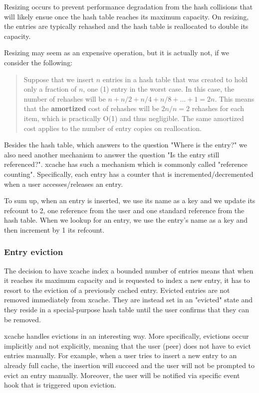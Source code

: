 Resizing occurs to prevent performance degradation from the hash collisions 
that will likely ensue once the hash table reaches its maximum capacity. On 
resizing, the entries are typically rehashed and the hash table is reallocated 
to double its capacity.

Resizing may seem as an expensive operation, but it is actually not, if we 
consider the following:
\begin{quotation}
\cite{hash-resize}Suppose that we insert \(n\) entries in a hash table that was 
created to hold only a fraction of \(n\), one (1) entry in the worst case. In 
this case, the number of rehashes will be \(n + n/2 + n/4 + n/8 + ... + 1 = 
	2n\).  This means that the \textbf{amortized} cost of rehashes will be 
\(2n/n = 2\) rehashes for each item, which is practically O(1) and thus 
negligible.  The same amortized cost applies to the number of entry copies on 
reallocation.
\end{quotation}

Besides the hash table, which answers to the question "Where is the entry?" we 
also need another mechanism to answer the question "Is the entry still 
referenced?". xcache has such a mechanism which is commonly called "reference 
counting". Specifically, each entry has a counter that is 
incremented/decremented when a user accesses/releases an entry.

To sum up, when an entry is inserted, we use its name as a key and we update 
its refcount to 2, one reference from the user and one standard reference from 
the hash table. When we lookup for an entry, we use the entry's name as a key 
and then increment by 1 its refcount. 

\subsubsection{Entry eviction}\label{sec:xcache-eviction-design}

The decision to have xcache index a bounded number of entries means that when 
it reaches its maximum capacity and is requested to index a new entry, it has 
to resort to the eviction of a previously cached entry. Evicted entries are not 
removed immediately from xcache. They are instead set in an "evicted" state and 
they reside in a special-purpose hash table until the user confirms that they 
can be removed. 

xcache handles evictions in an interesting way. More specifically, evictions 
occur implicitly and not explicitly, meaning that the user (peer) does not have 
to evict entries manually. For example, when a user tries to insert a new entry 
to an already full cache, the insertion will succeed and the user will not be 
prompted to evict an entry manually. Moreover, the user will be notified via 
specific event hook that is triggered upon eviction.

